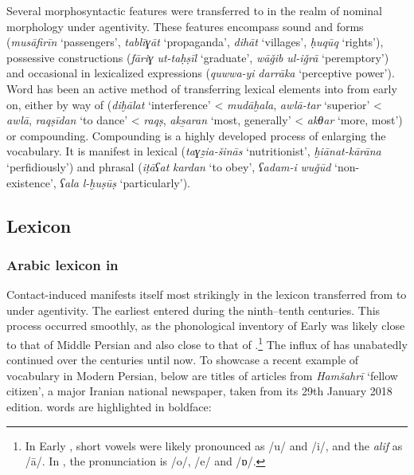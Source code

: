 \documentclass[output=paper]{langsci/langscibook}
\begin{document}
Several  morphosyntactic features were transferred to  in the realm of nominal morphology under  agentivity. These features encompass sound and  forms (\textit{musāfirīn} ‘passengers’, \textit{tablīɣāt} ‘propaganda’, \textit{dihāt} ‘villages’, \textit{ḥuqūq} ‘rights’), possessive constructions (\textit{fāriɣ} \textit{ut-taḥṣīl} ‘graduate’, \textit{wāǧib} \textit{ul-iǧrā} ‘peremptory’) and occasional   in lexicalized expressions (\textit{quwwa-yi} \textit{darrāka} ‘perceptive power’). Word  has been an active method of transferring  lexical elements into  from early on, either by way of  (\textit{diḫālat} ‘interference’ <  \textit{mudāḫala}, \textit{awlā-tar} ‘superior’ <  \textit{awlā}, \textit{raqṣīdan} ‘to dance’ <  \textit{raqṣ}, \textit{aks̱aran} ‘most, generally’ <  \textit{akθar} ‘more, most’) or compounding. Compounding is a highly developed process of enlarging the  vocabulary. It is manifest in lexical  (\textit{taɣẕia-šinās} ‘nutritionist’, \textit{ḫiānat-kārāna} ‘perfidiously’) and phrasal  (\textit{iṭāʕat} \textit{kardan} ‘to obey’, \textit{ʕadam-i} \textit{wuǧūd} ‘non-existence’, \textit{ʕala} \textit{l-ḫuṣūṣ} ‘particularly’).

\subsection{Lexicon}

\subsubsection{Arabic lexicon in }

Contact-induced  manifests itself most strikingly in the lexicon transferred from  to  under  agentivity. The earliest  entered  during the ninth–tenth centuries. This process occurred smoothly, as the phonological inventory of Early  was likely close to that of Middle Persian and also close to that of  .\footnote{In Early , short vowels were likely pronounced as /u/ and /i/, and the \textit{alif} as /ā/. In , the pronunciation is /o/, /e/ and /ɒ/.} The influx of   has unabatedly continued over the centuries until now. To showcase a recent example of  vocabulary in Modern Persian, below are titles of articles from \textit{Hamšahrī} ‘fellow citizen’, a major Iranian national newspaper, taken from its 29th January 2018 edition.  words are highlighted in boldface:
\end{document}
